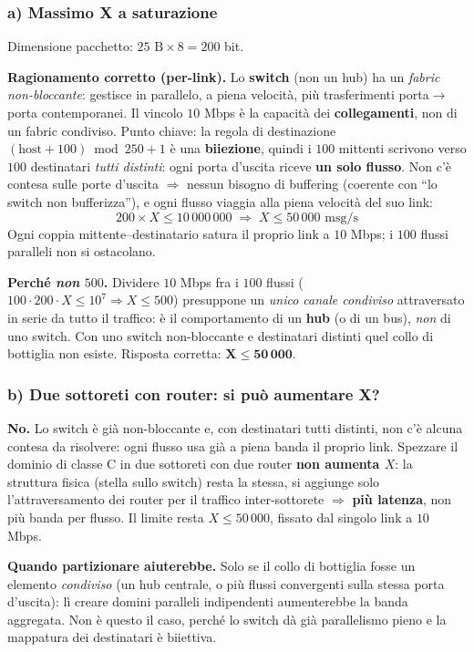 \documentclass[11pt,a4paper]{report}
\begin{document}
\subsubsection*{a) Massimo X a saturazione}

Dimensione pacchetto: $25 \text{ B} \times 8 = 200$ bit.

\textbf{Ragionamento corretto (per-link).} Lo \textbf{switch} (non un hub) ha un
\emph{fabric non-bloccante}: gestisce in parallelo, a piena velocità, più
trasferimenti porta$\to$porta contemporanei. Il vincolo $10$ Mbps è la capacità
dei \textbf{collegamenti}, non di un fabric condiviso. Punto chiave: la regola di
destinazione $(\text{host}+100)\bmod 250+1$ è una \textbf{biiezione}, quindi i
$100$ mittenti scrivono verso $100$ destinatari \emph{tutti distinti}: ogni porta
d'uscita riceve \textbf{un solo flusso}. Non c'è contesa sulle porte d'uscita
$\Rightarrow$ nessun bisogno di buffering (coerente con ``lo switch non
bufferizza''), e ogni flusso viaggia alla piena velocità del suo link:
\[
200 \times X \le 10\,000\,000
\;\Rightarrow\; \boxed{X \le 50\,000 \text{ msg/s}}
\]
Ogni coppia mittente--destinatario satura il proprio link a $10$ Mbps; i $100$
flussi paralleli non si ostacolano.

\textbf{Perché \emph{non} $500$.} Dividere $10$ Mbps fra i $100$ flussi
($100\cdot200\cdot X\le10^7\Rightarrow X\le500$) presuppone un \emph{unico canale
condiviso} attraversato in serie da tutto il traffico: è il comportamento di un
\textbf{hub} (o di un bus), \emph{non} di uno switch. Con uno switch
non-bloccante e destinatari distinti quel collo di bottiglia non esiste. Risposta
corretta: $\mathbf{X\le 50\,000}$.

\subsubsection*{b) Due sottoreti con router: si può aumentare X?}

\textbf{No.} Lo switch è già non-bloccante e, con destinatari tutti distinti, non
c'è alcuna contesa da risolvere: ogni flusso usa già a piena banda il proprio
link. Spezzare il dominio di classe C in due sottoreti con due router
\textbf{non aumenta $X$}: la struttura fisica (stella sullo switch) resta la
stessa, si aggiunge solo l'attraversamento dei router per il traffico
inter-sottorete $\Rightarrow$ \textbf{più latenza}, non più banda per flusso. Il
limite resta $X\le 50\,000$, fissato dal singolo link a $10$ Mbps.

\textbf{Quando partizionare aiuterebbe.} Solo se il collo di bottiglia fosse un
elemento \emph{condiviso} (un hub centrale, o più flussi convergenti sulla stessa
porta d'uscita): lì creare domini paralleli indipendenti aumenterebbe la banda
aggregata. Non è questo il caso, perché lo switch dà già parallelismo pieno e la
mappatura dei destinatari è biiettiva.
\end{document}
